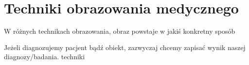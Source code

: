 \section{Techniki obrazowania medycznego}
\label{MedicalDiagnostics}

W różnych technikach obrazowania, obraz powstaje w jakiś konkretny sposób

Jeżeli diagnozujemy pacjent bądź obiekt, zazwyczaj chcemy zapisać wynik naszej diagnozy/badania.
techniki

